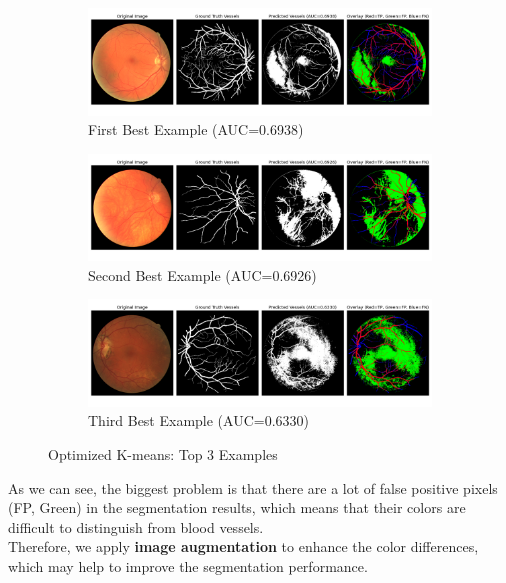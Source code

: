 \documentclass[12pt,letterpaper]{article}
\begin{document}
\begin{figure}[H]
    \centering
    \begin{subfigure}[H]{\textwidth}
        \centering
        \includegraphics[scale=0.35]{Figures/3 Optimized 1st.png}
        \vspace{-0.5cm}
        \caption{First Best Example (AUC=0.6938)}
        \label{fig:opt1}
    \end{subfigure}
    \begin{subfigure}[H]{\textwidth}
        \centering
        \includegraphics[scale=0.35]{Figures/3 Optimized 2nd.png}
        \vspace{-0.5cm}
        \caption{Second Best Example (AUC=0.6926)}
        \label{fig:opt2}
    \end{subfigure}
    \begin{subfigure}[H]{\textwidth}
        \centering
        \includegraphics[scale=0.35]{Figures/3 Optimized 3rd.png}
        \vspace{-0.5cm}
        \caption{Third Best Example (AUC=0.6330)}
        \label{fig:opt3}
    \end{subfigure}
    \caption{Optimized K-means: Top 3 Examples}
    \label{fig:opt}
\end{figure}
\noindent
As we can see, the biggest problem is that there are a lot of false positive pixels (FP, Green) in the segmentation results, which means that their colors are difficult to distinguish from blood vessels. \\
Therefore, we apply \textbf{image augmentation} to enhance the color differences, which may help to improve the segmentation performance. 
\end{document}
